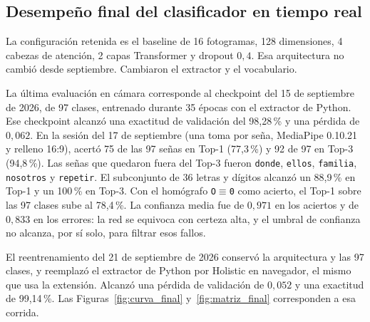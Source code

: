 \subsection{Desempeño final del clasificador en tiempo real}

La configuración retenida es el baseline de 16 fotogramas, 128 dimensiones, 4 cabezas de atención, 2 capas Transformer y dropout $0{,}4$. Esa arquitectura no cambió desde septiembre. Cambiaron el extractor y el vocabulario.

La última evaluación en cámara corresponde al checkpoint del 15 de septiembre de 2026, de 97 clases, entrenado durante 35 épocas con el extractor de Python. Ese checkpoint alcanzó una exactitud de validación del 98{,}28\,\% y una pérdida de $0{,}062$. En la sesión del 17 de septiembre (una toma por seña, MediaPipe 0.10.21 y relleno 16:9), acertó 75 de las 97 señas en Top-1 (77{,}3\,\%) y 92 de 97 en Top-3 (94{,}8\,\%). Las señas que quedaron fuera del Top-3 fueron \texttt{donde}, \texttt{ellos}, \texttt{familia}, \texttt{nosotros} y \texttt{repetir}. El subconjunto de 36 letras y dígitos alcanzó un 88{,}9\,\% en Top-1 y un 100\,\% en Top-3. Con el homógrafo \texttt{O}$\equiv$\texttt{0} como acierto, el Top-1 sobre las 97 clases sube al 78{,}4\,\%. La confianza media fue de $0{,}971$ en los aciertos y de $0{,}833$ en los errores: la red se equivoca con certeza alta, y el umbral de confianza no alcanza, por sí solo, para filtrar esos fallos.

El reentrenamiento del 21 de septiembre de 2026 conservó la arquitectura y las 97 clases, y reemplazó el extractor de Python por Holistic en navegador, el mismo que usa la extensión. Alcanzó una pérdida de validación de $0{,}052$ y una exactitud de 99{,}14\,\%. Las Figuras~\ref{fig:curva_final} y~\ref{fig:matriz_final} corresponden a esa corrida.

